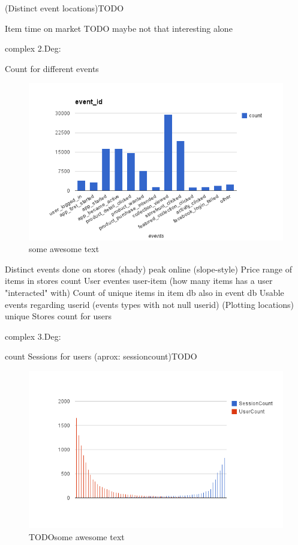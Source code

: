         (Distinct event locations)TODO

        Item time on market TODO maybe not that interesting alone


    complex 2.Deg:

        Count for different events

\begin{figure}[H]
    \includegraphics[width=5in]{image/event_id.png}
    \centering
    \caption[Count for different events]{some awesome text}
    \label{figure:ratingdistr}
\end{figure}

        Distinct events done on stores (shady)
        peak online (slope-style)
        Price range of items in stores
        count User eventes
        user-item (how many items has a user "interacted" with)
        Count of unique items in item db also in event db
        Usable events regarding userid (events types with not null userid)
        (Plotting locations)
        unique Stores count for users

    complex 3.Deg:

        count Sessions for users (aprox: sessioncount)TODO

\begin{figure}[H]
    \includegraphics[width=5in]{image/global_sessioncount.png}
    \centering
    \caption[Count of sessions per user mapped with count of user with give session amount]{TODOsome awesome text}
    \label{figure:ratingdistr}
\end{figure}


